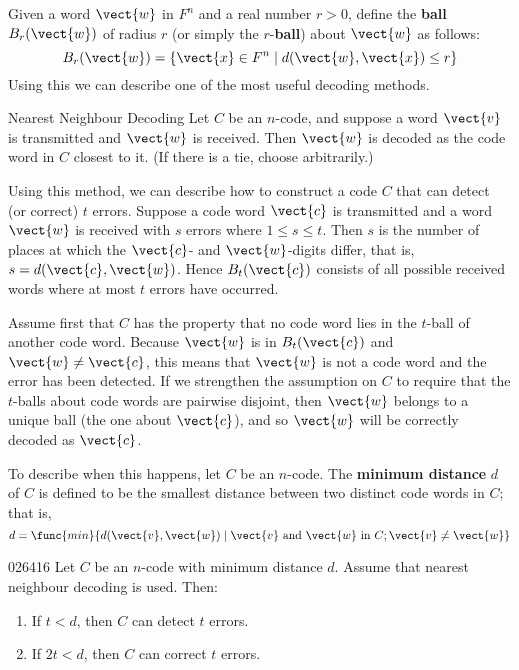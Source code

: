 Given a word $\vect{w}$ in $F^{n}$ and a real number $r > 0$, define the \textbf{ball} $B_{r}(\vect{w})$ of radius $r$ (or simply the $r$-\textbf{ball}) about $\vect{w}$ as follows:
\begin{equation*}
B_{r}(\vect{w}) = \{\vect{x} \in F^n \mid d(\vect{w}, \vect{x}) \le r \}
\end{equation*}
Using this we can describe one of the most useful decoding methods.

\begin{theorem*}[label=thm:neighbourdecoding]{Nearest Neighbour Decoding}
Let $C$ be an $n$-code, and suppose a word $\vect{v}$ is transmitted and $\vect{w}$ is received. Then $\vect{w}$ is decoded as the code word in $C$ closest to it. (If there is a tie, choose arbitrarily.)
\end{theorem*}

Using this method, we can describe how to construct a code $C$ that can detect (or correct) $t$ errors. Suppose a code word $\vect{c}$ is transmitted and a word $\vect{w}$ is received with $s$ errors where $1 \leq s \leq t$. Then $s$ is the number of places at which the $\vect{c}$- and $\vect{w}$-digits differ, that is, $s = d(\vect{c}, \vect{w})$. Hence $B_{t}(\vect{c})$ consists of all possible received words where at most $t$ errors have occurred.

Assume first that $C$ has the property that no code word lies in the $t$-ball of another code word. Because $\vect{w}$ is in $B_{t}(\vect{c})$ and $\vect{w} \neq \vect{c}$, this means that $\vect{w}$ is not a code word and the error has been detected. If we strengthen the assumption on $C$ to require that the $t$-balls about code words are pairwise disjoint, then $\vect{w}$ belongs to a unique ball (the one about $\vect{c}$), and so $\vect{w}$ will be correctly decoded as $\vect{c}$.

To describe when this happens, let $C$ be an $n$-code. The \textbf{minimum distance} $d$ of $C$ is defined to be the smallest distance between two distinct code words in $C$; that is,
\begin{equation*}
d = \func{min} \{d(\vect{v}, \vect{w}) \mid \vect{v} \mbox{ and } \vect{w} \mbox{ in } C; \vect{v} \neq \vect{w} \}
\end{equation*}

\begin{theorem}{}{026416}
Let $C$ be an $n$-code with minimum distance $d$. Assume that nearest neighbour decoding is used. Then:

\begin{enumerate}
\item If $t < d$, then $C$ can detect $t$ errors.\footnotemark

\item If $2t < d$, then $C$ can correct $t$ errors.

\end{enumerate}
\end{theorem}

